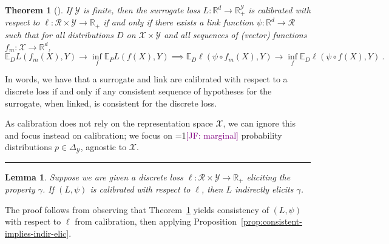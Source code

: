 \documentclass{article}
\newcommand{\Comments}{1}
\newcommand{\mynote}[2]{\ifnum\Comments=1\textcolor{#1}{#2}\fi}
\newcommand{\jessie}[1]{\mynote{purple}{[JF: #1]}}
\newcommand{\reals}{\mathbb{R}}
\newcommand{\simplex}{\Delta_\Y}
\newcommand{\E}{\mathbb{E}}
\newcommand{\R}{\mathcal{R}}
\newcommand{\X}{\mathcal{X}}
\newcommand{\Y}{\mathcal{Y}}
\newtheorem{theorem}{Theorem}
\newtheorem{lemma}{Lemma}
\begin{document}
\begin{theorem}[\cite{ramaswamy2016convex}]\label{thm:calib-iff-consistent}
	If $\Y$ is finite, then the surrogate loss $L:\reals^d \to \reals^\Y_+$ is calibrated with respect to $\ell: \R \times \Y \to \reals_+$ if and only if there exists a link function $\psi : \reals^d \to \R$ such that for all distributions $D$ on $\X \times\Y$ and all sequences of (vector) functions $f_m : \X \to \reals^d$,
	\begin{equation*}
	\E_D L(f_m(X), Y) \to \inf_f \E_P L(f(X), Y) \implies \E_D \ell(\psi  \circ f_m(X), Y) \to \inf_f \E_D \ell(\psi \circ f(X), Y)~.~
	\end{equation*}
\end{theorem}
In words, we have that a surrogate and link are calibrated with respect to a discrete loss if and only if any consistent sequence of hypotheses for the surrogate, when linked, is consistent for the discrete loss.

As calibration does not rely on the representation space $\X$, we can ignore this and focus instead on calibration; we focus on \jessie{marginal} probability distributions $p \in \simplex$, agnostic to $\X$.

\hrule 
\bigskip

\begin{lemma}
	Suppose we are given a discrete loss $\ell : \R \times\Y \to \reals_+$ eliciting the property $\gamma$.
	If $(L, \psi)$ is calibrated with respect to $\ell$, then $L$ indirectly elicits $\gamma$.
\end{lemma}
The proof follows from observing that Theorem~\ref{thm:calib-iff-consistent} yields consistency of $(L,\psi)$ with respect to $\ell$ from calibration, then applying Proposition~\ref{prop:consistent-implies-indir-elic}.

\iffalse
\begin{lemma}
  If a convex loss $L:\reals^d \times\Y \to \reals$ with $|\Y| < \infty$ indirectly elicits a finite property $\gamma$, then for all $p \in \simplex$ and $r \in \gamma(p)$, there is a flat $F$ containing $p$ that is $(n-d-1)$-dimensional such that $F \cap \simplex \subseteq \gamma_r$.
\end{lemma}
This is the contrapositive of Theorem~\ref{thm:cvx-flats}, and what is actually proven there.
\fi
\end{document}
